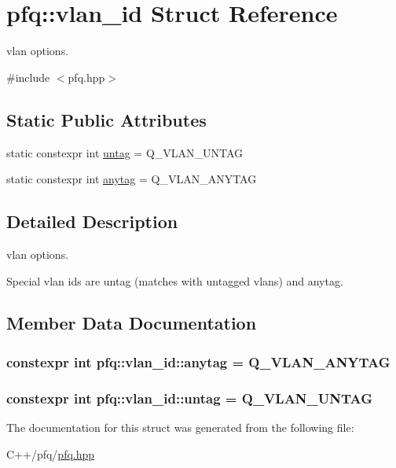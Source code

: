 \hypertarget{structpfq_1_1vlan__id}{\section{pfq\+:\+:vlan\+\_\+id Struct Reference}
\label{structpfq_1_1vlan__id}
}


vlan options.  




{\ttfamily \#include $<$pfq.\+hpp$>$}

\subsection*{Static Public Attributes}
\begin{DoxyCompactItemize}
\item 
static constexpr int \hyperlink{structpfq_1_1vlan__id_a9e30bbd86d62e58ae5e5e080f7e046df}{untag} = Q\+\_\+\+V\+L\+A\+N\+\_\+\+U\+N\+T\+A\+G
\item 
static constexpr int \hyperlink{structpfq_1_1vlan__id_affdae3b855070274e64b5d5696d6d72e}{anytag} = Q\+\_\+\+V\+L\+A\+N\+\_\+\+A\+N\+Y\+T\+A\+G
\end{DoxyCompactItemize}


\subsection{Detailed Description}
vlan options. 

Special vlan ids are untag (matches with untagged vlans) and anytag. 

\subsection{Member Data Documentation}
\hypertarget{structpfq_1_1vlan__id_affdae3b855070274e64b5d5696d6d72e}{
\subsubsection[{anytag}]{\setlength{\rightskip}{0pt plus 5cm}constexpr int pfq\+::vlan\+\_\+id\+::anytag = Q\+\_\+\+V\+L\+A\+N\+\_\+\+A\+N\+Y\+T\+A\+G\hspace{0.3cm}{\ttfamily [static]}}}\label{structpfq_1_1vlan__id_affdae3b855070274e64b5d5696d6d72e}
\hypertarget{structpfq_1_1vlan__id_a9e30bbd86d62e58ae5e5e080f7e046df}{
\subsubsection[{untag}]{\setlength{\rightskip}{0pt plus 5cm}constexpr int pfq\+::vlan\+\_\+id\+::untag = Q\+\_\+\+V\+L\+A\+N\+\_\+\+U\+N\+T\+A\+G\hspace{0.3cm}{\ttfamily [static]}}}\label{structpfq_1_1vlan__id_a9e30bbd86d62e58ae5e5e080f7e046df}


The documentation for this struct was generated from the following file\+:\begin{DoxyCompactItemize}
\item 
C++/pfq/\hyperlink{pfq_8hpp}{pfq.\+hpp}\end{DoxyCompactItemize}
